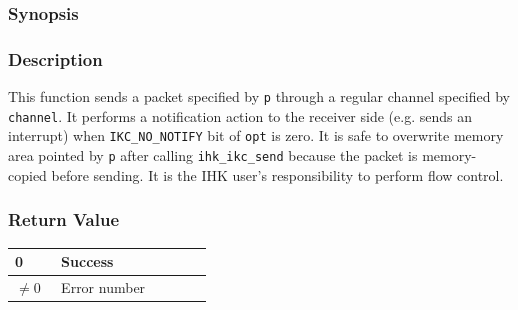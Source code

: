 \documentclass[twoside,11pt,fleqn]{book}
\begin{document}
\subsubsection{}
\subsubsection*{Synopsis}{\quad}
\subsubsection*{Description}{\quad}
This function sends a packet specified by \texttt{p} through a regular channel specified by \texttt{channel}.
It performs a notification action to the receiver side (e.g. sends an interrupt) when \texttt{IKC\_NO\_NOTIFY} bit of \texttt{opt} is zero.
It is safe to overwrite memory area pointed by \texttt{p} after calling \texttt{ihk\_ikc\_send} because the packet is memory-copied before sending.
It is the IHK user's responsibility to perform flow control.
\subsubsection*{Return Value}{\quad}
\begin{table}[!h]
\footnotesize
\begin{tabular}{|p{0.20\linewidth}|p{0.66\linewidth}|} \hline
0&Success\\ \hline
$\ne 0$&Error number\\ \hline
\end{tabular}
\vspace{-0em}
\end{table}
\FloatBarrier

\end{document}
